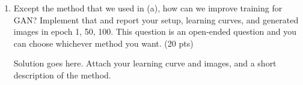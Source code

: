 \documentclass[a4paper]{article}
\theoremstyle{definition}
\newenvironment{soln}{
	\leavevmode\color{blue}\ignorespaces
}{}
\begin{document}
\begin{enumerate} [label=(\alph*)]
		\begin{soln}  Solution goes here. Attach your learning curve and images. \end{soln}
		
		\item Except the method that we used in (a), how can we improve training for GAN? Implement that and report your setup, learning curves, and generated images in epoch 1, 50, 100.
        This question is an open-ended question and you can choose whichever method you want.
		\hfill (20 pts)
		
		\begin{soln}  Solution goes here. Attach your learning curve and images, and a short description of the method. \end{soln}
		
	\end{enumerate}
\end{document}
